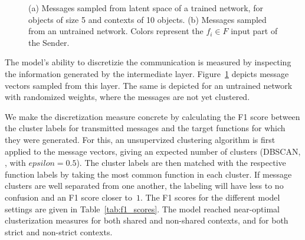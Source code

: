 \documentclass[11pt,a4paper]{article}
\begin{document}
\begin{figure}[ht]
  \centering
  \quad
  \caption{(a) Messages sampled from latent space of a trained network, for objects of size 5 and contexts of 10 objects. (b) Messages sampled from an untrained network. Colors represent the $f_i \in F$ input part of the Sender.}
 \label{fig:messages}
\end{figure}

The model's ability to discretizie the communication is measured by inspecting the information generated by the intermediate layer. Figure~\ref{fig:messages} depicts message vectors sampled from this layer. The same is depicted for an untrained network with randomized weights, where the messages are not yet clustered. 

We make the discretization measure concrete by calculating the F1 score between the cluster labels for transmitted messages and the target functions for which they were generated. For this, an unsupervized clustering algorithm is first applied to the message vectors, giving an expected number of clusters (DBSCAN, \citealp{ester_density-based_1996}, with $epsilon = 0.5$). The cluster labels are then matched with the respective function labels by taking the most common function in each cluster. If message clusters are well separated from one another, the labeling will have less to no confusion and an F1 score closer to~$1$. The F1 scores for the different model settings are given in Table~\ref{tab:f1_scores}. The model reached near-optimal clusterization measures for both shared and non-shared contexts, and for both strict and non-strict contexts. 
\end{document}
